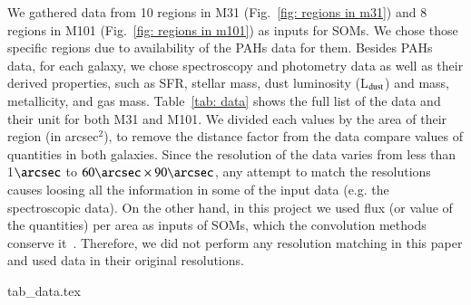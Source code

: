 We gathered data from 10 regions in M31 (Fig.~\ref{fig: regions in m31}) and 8 regions in M101 (Fig.~\ref{fig: regions in m101}) as inputs for SOMs.
We chose those specific regions due to availability of the PAHs data for them.
Besides PAHs data, for each galaxy, we chose spectroscopy and photometry data as well as their derived properties, such as SFR, stellar mass, dust luminosity (L$_{\rm dust}$) and mass, metallicity, and gas mass.
Table~\ref{tab: data} shows the full list of the data and their unit for both M31 and M101.
We divided each values by the area of their region (in arcsec$^2$), to remove the distance factor from the data compare values of quantities in both galaxies.
Since the resolution of the data varies from less than 1$\arcsec$ to $60\arcsec \times 90 \arcsec$, any attempt to match the resolutions causes loosing all the information in some of the input data (e.g. the spectroscopic data).
On the other hand, in this project we used flux (or value of the quantities) per area as inputs of SOMs, which the convolution methods conserve it~\citep{Aniano12}.
Therefore, we did not perform any resolution matching in this paper and used data in their original resolutions.


{tab_data.tex}


